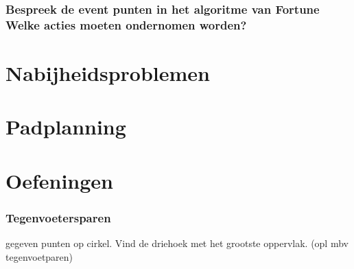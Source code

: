 \documentclass[12pt,a4paper]{article}
\begin{document}
\section{Bespreek de event punten in het algoritme van Fortune Welke acties moeten ondernomen worden?}
\fi

\part{Nabijheidsproblemen}
\iffalse
\section{wat betekent volgende uitspraak: probleem A is ?(N) transformeerbaar tot probleem B? waarvoor kan een dergelijke uitspraak nuttig gebruikt worden + vb}
\section{wat is een EMDB van een vz punten + verband met Voronoi diagramma van een vz punten?}
\section{bespreek beknopt hoe een EMDB van een vz punten kan berkend worden in O(nlogn) bewerkingen}
\fi

\part{Padplanning}
\iffalse
\section{Hoe bepaal je het gebied dat kan bereikt worden door een robotarm met 3 segmenten. Is de volgorde van de stukken belangrijk?}
\section{Geef en bespreek de minkovski-som met een voorbeeld.}
\fi
\fi

\part{Oefeningen}





\iffalse

\section{Tegenvoetersparen}
gegeven punten op cirkel. Vind de driehoek met het grootste oppervlak.
(opl mbv tegenvoetparen) 
\end{document}
